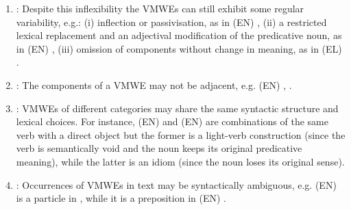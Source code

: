 \documentclass[output=paper,modfonts]{langscibook}
\begin{document}
\begin{enumerate}

\item\label{prop:variability} :  Despite this inflexibility the VMWEs can still exhibit some regular variability, e.g.: (i) inflection or passivisation, as in (EN) , (ii) a restricted lexical replacement and an  adjectival modification of the predicative noun, as in (EN) , (iii) omission of components without change in meaning, as in (EL) %
.
\item\label{prop:nonadj} : The components of a VMWE may not be adjacent, e.g. (EN) , . 
\item\label{prop:categ} : VMWEs of different categories may share the same syntactic structure and lexical choices. For instance,  (EN)  and (EN)  are combinations of the same verb with a direct object but the former is a light-verb construction (since the verb is semantically void and the noun keeps its original predicative meaning), while  the latter is an idiom (since the noun loses its original sense). 
\item\label{prop:synt-amb}:  Occurrences of VMWEs in text may be syntactically ambiguous, e.g. (EN)  is a particle in , while it is a preposition in (EN) . 

\end{enumerate}
\end{document}
